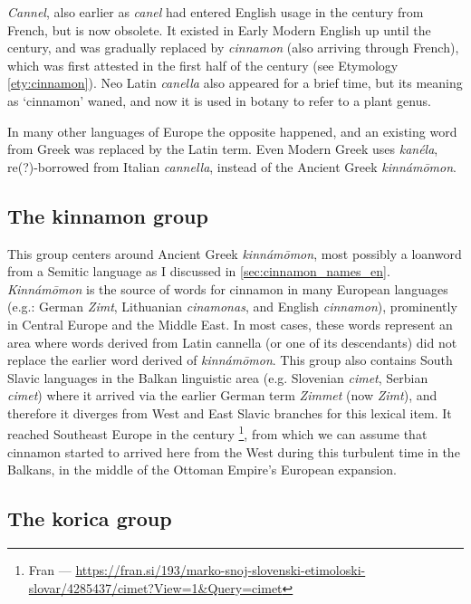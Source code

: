 \textit{\obs Cannel}, also earlier as \textit{canel} had entered English usage in the  century from French, but is now obsolete. It existed in Early Modern English up until the  century, and was gradually replaced by \textit{cinnamon} (also arriving through French), which was first attested in the first half of the  century (see Etymology \ref{ety:cinnamon}). Neo Latin \textit{canella} also appeared for a brief time, but its meaning as `cinnamon' waned, and now it is used in botany to refer to a plant genus.

In many other languages of Europe the opposite happened, and an existing word from Greek was replaced by the Latin term. Even Modern Greek uses \textit{kanéla}, re(?)-borrowed from Italian \textit{cannella}, instead of the Ancient Greek \textit{kinnámōmon}. 

\subsection{The kinnamon group}

This group centers around Ancient Greek \textit{kinnámōmon}, most possibly a loanword from a Semitic language as I discussed in \cref{sec:cinnamon_names_en}. \textit{Kinnámōmon} is the source of words for cinnamon in many European languages (e.g.: German \textit{Zimt}, Lithuanian \textit{cinamonas}, and English \textit{cinnamon}), prominently in Central Europe and the Middle East. In most cases, these words represent an area where words derived from Latin cannella (or one of its descendants) did not replace the earlier word derived of \textit{kinnámōmon}. This group also contains South Slavic languages in the Balkan linguistic area (e.g. Slovenian \textit{cimet}, Serbian  \textit{cimet}) where it arrived via the earlier German term \textit{Zimmet} (now \textit{Zimt}), and therefore it diverges from West and East Slavic branches for this lexical item. It reached Southeast Europe in the  century \autocite[s.v. cimet]{snoj_slovenski_1997}\footnote{Fran --- \url{https://fran.si/193/marko-snoj-slovenski-etimoloski-slovar/4285437/cimet?View=1\&Query=cimet}}, from which we can assume that cinnamon started to arrived here from the West during this turbulent time in the Balkans, in the middle of the Ottoman Empire's European expansion.

\subsection{The korica group}


